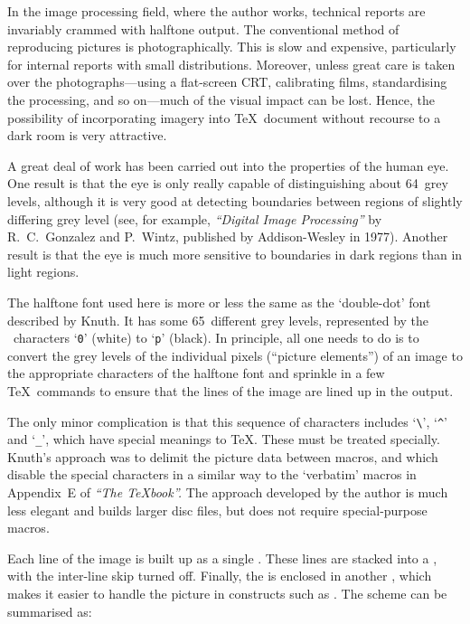 In the image processing field, where the author works, technical reports
are invariably crammed with halftone output. The conventional method of
reproducing pictures is photographically. This is slow and
expensive, particularly for internal reports with small distributions.
Moreover, unless great care is taken over the photographs---using a
flat-screen {\mc CRT}, calibrating films, standardising the processing,
and so on---much of the visual impact can be lost. Hence, the
possibility of incorporating imagery into \TeX\ document without
recourse to a dark room is very attractive.

A great deal of work has been carried out into the properties of the human eye.
One result is that the eye is only really capable of distinguishing about
64~grey levels, although it is very good at detecting boundaries between
regions of slightly differing grey level (see, for example, {\sl ``Digital
Image Processing''\/} by R.~C.~Gonzalez and P.~Wintz, published by
Addison-Wesley in 1977). Another result is that the eye is much more sensitive
to boundaries in dark regions than in light regions. 

The halftone font used here is more or less the same as the `double-dot'
font described by Knuth. It has some 65~different grey levels,
represented by the \ASCII\ characters `{\tt 0}' (white) to `{\tt p}'
(black). In principle, all one needs to do is to convert the grey
levels of the individual pixels (``picture elements'') of an image
to the appropriate characters of the halftone font and sprinkle in
a few \TeX\ commands to ensure that the lines of the image are lined
up in the output.

The only minor complication is that this sequence of characters includes
`\verb"\"', `\verb"^"' and `\verb"_"', which have special meanings to \TeX.
These must be treated specially. Knuth's approach was to delimit the picture
data between macros,  and  which disable
the special characters in a similar way to the `verbatim' macros in Appendix~E
of {\sl ``The \TeX book''.\/} The approach developed by the author is much less
elegant and builds larger disc files, but does not require special-purpose
macros. 

Each line of the image is built up as a single . These
lines are stacked into a , with the inter-line skip turned
off. Finally, the  is enclosed in another , which makes
it easier to handle the picture in constructs such as
. The scheme can be summarised as:

